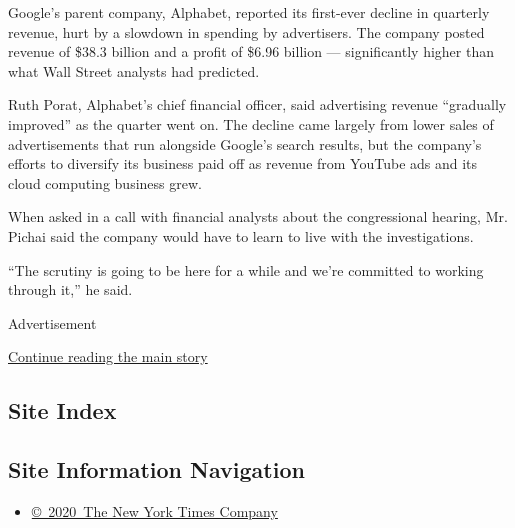 Google's parent company, Alphabet, reported its first-ever decline in
quarterly revenue, hurt by a slowdown in spending by advertisers. The
company posted revenue of \$38.3 billion and a profit of \$6.96 billion
--- significantly higher than what Wall Street analysts had predicted.

Ruth Porat, Alphabet's chief financial officer, said advertising revenue
``gradually improved'' as the quarter went on. The decline came largely
from lower sales of advertisements that run alongside Google's search
results, but the company's efforts to diversify its business paid off as
revenue from YouTube ads and its cloud computing business grew.

When asked in a call with financial analysts about the congressional
hearing, Mr. Pichai said the company would have to learn to live with
the investigations.

``The scrutiny is going to be here for a while and we're committed to
working through it,'' he said.

Advertisement

\protect\hyperlink{after-bottom}{Continue reading the main story}

\hypertarget{site-index}{%
\subsection{Site Index}\label{site-index}}

\hypertarget{site-information-navigation}{%
\subsection{Site Information
Navigation}\label{site-information-navigation}}

\begin{itemize}
\tightlist
\item
  \href{https://help.nytimes3xbfgragh.onion/hc/en-us/articles/115014792127-Copyright-notice}{©~2020~The
  New York Times Company}
\end{itemize}

